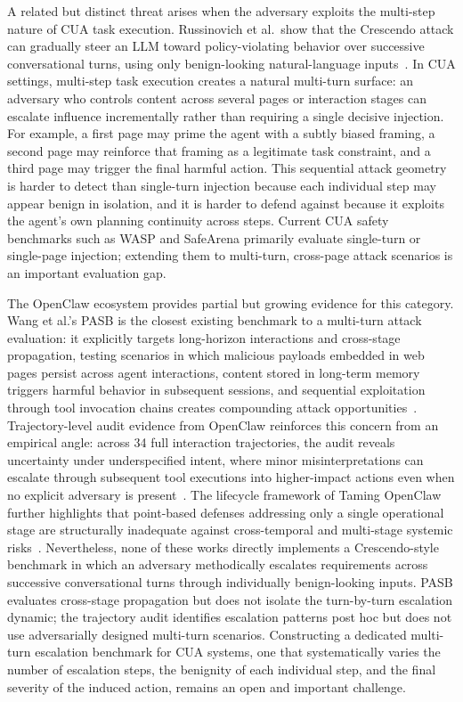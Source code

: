 A related but distinct threat arises when the adversary exploits the multi-step nature of CUA task execution. Russinovich et al.\ show that the Crescendo attack can gradually steer an LLM toward policy-violating behavior over successive conversational turns, using only benign-looking natural-language inputs~\cite{crescendo2025}. In CUA settings, multi-step task execution creates a natural multi-turn surface: an adversary who controls content across several pages or interaction stages can escalate influence incrementally rather than requiring a single decisive injection. For example, a first page may prime the agent with a subtly biased framing, a second page may reinforce that framing as a legitimate task constraint, and a third page may trigger the final harmful action. This sequential attack geometry is harder to detect than single-turn injection because each individual step may appear benign in isolation, and it is harder to defend against because it exploits the agent's own planning continuity across steps. Current CUA safety benchmarks such as WASP and SafeArena primarily evaluate single-turn or single-page injection; extending them to multi-turn, cross-page attack scenarios is an important evaluation gap.

The OpenClaw ecosystem provides partial but growing evidence for this category. Wang et al.'s PASB is the closest existing benchmark to a multi-turn attack evaluation: it explicitly targets long-horizon interactions and cross-stage propagation, testing scenarios in which malicious payloads embedded in web pages persist across agent interactions, content stored in long-term memory triggers harmful behavior in subsequent sessions, and sequential exploitation through tool invocation chains creates compounding attack opportunities~\cite{doubleagent2026}. Trajectory-level audit evidence from OpenClaw reinforces this concern from an empirical angle: across 34 full interaction trajectories, the audit reveals uncertainty under underspecified intent, where minor misinterpretations can escalate through subsequent tool executions into higher-impact actions even when no explicit adversary is present~\cite{clawaudit2026}. The lifecycle framework of Taming OpenClaw further highlights that point-based defenses addressing only a single operational stage are structurally inadequate against cross-temporal and multi-stage systemic risks~\cite{tamingopenclaw2026}. Nevertheless, none of these works directly implements a Crescendo-style benchmark in which an adversary methodically escalates requirements across successive conversational turns through individually benign-looking inputs. PASB evaluates cross-stage propagation but does not isolate the turn-by-turn escalation dynamic; the trajectory audit identifies escalation patterns post hoc but does not use adversarially designed multi-turn scenarios. Constructing a dedicated multi-turn escalation benchmark for CUA systems, one that systematically varies the number of escalation steps, the benignity of each individual step, and the final severity of the induced action, remains an open and important challenge.

